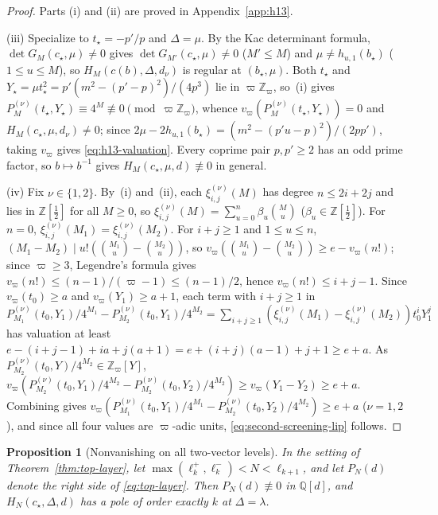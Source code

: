 \documentclass[twoside,10pt]{article}
\numberwithin{equation}{section}
\theoremstyle{slbody}
\newtheorem{proposition}[theorem]{Proposition}
\theoremstyle{definition}
\theoremstyle{remark}
\begin{document}
\begin{proof}
Parts (i) and (ii) are proved in Appendix~\ref{app:h13}.

(iii) Specialize to \(t_\star=-p'/p\) and \(\Delta=\mu\).  By the Kac
determinant formula, \(\det G_M(c_\star,\mu)\neq0\) gives
\(\det G_{M'}(c_\star,\mu)\neq0\) (\(M'\leq M\)) and
\(\mu\neq h_{u,1}(b_\star)\) (\(1\leq u\leq M\)), so
\(H_M(c(b),\Delta,d_\nu)\) is regular at \((b_\star,\mu)\).  Both \(t_\star\)
and \(Y_\star=\mu t_\star^2=p'(m^2-(p'-p)^2)/(4p^3)\) lie in
\(\varpi\mathbb Z_\varpi\), so~(i) gives
\(P_M^{(\nu)}(t_\star,Y_\star)\equiv4^M\not\equiv0\pmod{\varpi\mathbb Z_\varpi}\),
whence \(v_\varpi(P_M^{(\nu)}(t_\star,Y_\star))=0\) and
\(H_M(c_\star,\mu,d_\nu)\neq0\); since
\(2\mu-2h_{u,1}(b_\star)=(m^2-(p'u-p)^2)/(2pp')\), taking \(v_\varpi\) gives
\eqref{eq:h13-valuation}.  Every coprime pair \(p,p'\geq2\) has an odd prime
factor, so \(b\mapsto b^{-1}\) gives \(H_M(c_\star,\mu,d)\not\equiv0\) in
general.

(iv) Fix \(\nu\in\{1,2\}\).  By~(i)
and~(ii), each \(\xi_{i,j}^{(\nu)}(M)\) has degree \(n\leq2i+2j\) and lies in
\(\mathbb Z[\tfrac12]\) for all \(M\geq0\), so
\(\xi_{i,j}^{(\nu)}(M)=\sum_{u=0}^n\beta_u\binom{M}{u}\)
(\(\beta_u\in\mathbb Z[\tfrac12]\)).  For \(n=0\),
\(\xi_{i,j}^{(\nu)}(M_1)=\xi_{i,j}^{(\nu)}(M_2)\).  For \(i+j\geq1\) and
\(1\leq u\leq n\), \((M_1-M_2)\mid u!(\binom{M_1}{u}-\binom{M_2}{u})\), so
\(v_\varpi(\binom{M_1}{u}-\binom{M_2}{u})\geq e-v_\varpi(n!)\); since \(\varpi\geq3\),
Legendre's formula gives \(v_\varpi(n!)\leq(n-1)/(\varpi-1)\leq(n-1)/2\), hence
\(v_\varpi(n!)\leq i+j-1\).  Since \(v_\varpi(t_0)\geq a\) and
\(v_\varpi(Y_1)\geq a+1\), each term with \(i+j\geq1\) in
\(P_{M_1}^{(\nu)}(t_0,Y_1)/4^{M_1}-P_{M_2}^{(\nu)}(t_0,Y_1)/4^{M_2}
=\sum_{i+j\geq1}(\xi_{i,j}^{(\nu)}(M_1)-\xi_{i,j}^{(\nu)}(M_2))t_0^iY_1^j\)
has valuation at least \(e-(i+j-1)+ia+j(a+1)=e+(i+j)(a-1)+j+1\geq e+a\).
As \(P_{M_2}^{(\nu)}(t_0,Y)/4^{M_2}\in\mathbb Z_\varpi[Y]\),
\(v_\varpi(P_{M_2}^{(\nu)}(t_0,Y_1)/4^{M_2}-P_{M_2}^{(\nu)}(t_0,Y_2)/4^{M_2})
\geq v_\varpi(Y_1-Y_2)\geq e+a\).  Combining gives
\(v_\varpi(P_{M_1}^{(\nu)}(t_0,Y_1)/4^{M_1}-P_{M_2}^{(\nu)}(t_0,Y_2)/4^{M_2})\geq e+a\)
(\(\nu=1,2\)), and since all four values are \(\varpi\)-adic units,
\eqref{eq:second-screening-lip} follows.
\end{proof}

\begin{proposition}[Nonvanishing on all two-vector levels]
\label{prop:two-term-criteria}
In the setting of Theorem~\ref{thm:top-layer}, let
\(\max(\ell^+_k,\ell^-_k)<N<\ell_{k+1}\), and let \(P_N(d)\) denote the
right side of \eqref{eq:top-layer}.  Then \(P_N(d)\not\equiv0\) in
\(\mathbb Q[d]\), and \(H_N(c_\star,\Delta,d)\) has a pole of order exactly
\(k\) at \(\Delta=\lambda\).
\end{proposition}
\end{document}
